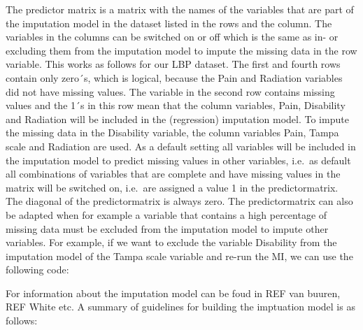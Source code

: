 \documentclass[]{book}
\newenvironment{Shaded}{\begin{snugshade}}{\end{snugshade}}
\newcommand{\KeywordTok}[1]{\textcolor[rgb]{0.13,0.29,0.53}{\textbf{#1}}}
\newcommand{\DataTypeTok}[1]{\textcolor[rgb]{0.13,0.29,0.53}{#1}}
\newcommand{\DecValTok}[1]{\textcolor[rgb]{0.00,0.00,0.81}{#1}}
\newcommand{\StringTok}[1]{\textcolor[rgb]{0.31,0.60,0.02}{#1}}
\newcommand{\OperatorTok}[1]{\textcolor[rgb]{0.81,0.36,0.00}{\textbf{#1}}}
\newcommand{\NormalTok}[1]{#1}
\theoremstyle{definition}
\theoremstyle{definition}
\theoremstyle{definition}
\theoremstyle{remark}
\begin{document}
The predictor matrix is a matrix with the names of the variables that
are part of the imputation model in the dataset listed in the rows and
the column. The variables in the columns can be switched on or off which
is the same as in- or excluding them from the imputation model to impute
the missing data in the row variable. This works as follows for our LBP
dataset. The first and fourth rows contain only zero´s, which is
logical, because the Pain and Radiation variables did not have missing
values. The variable in the second row contains missing values and the
1´s in this row mean that the column variables, Pain, Disability and
Radiation will be included in the (regression) imputation model. To
impute the missing data in the Disability variable, the column variables
Pain, Tampa scale and Radiation are used. As a default setting all
variables will be included in the imputation model to predict missing
values in other variables, i.e.~as default all combinations of variables
that are complete and have missing values in the matrix will be switched
on, i.e.~are assigned a value 1 in the predictormatrix. The diagonal of
the predictormatrix is always zero. The predictormatrix can also be
adapted when for example a variable that contains a high percentage of
missing data must be excluded from the imputation model to impute other
variables. For example, if we want to exclude the variable Disability
from the imputation model of the Tampa scale variable and re-run the MI,
we can use the following code:

\begin{Shaded}
\end{Shaded}

For information about the imputation model can be foud in REF van
buuren, REF White etc. A summary of guidelines for building the
imptuation model is as follows:
\end{document}
